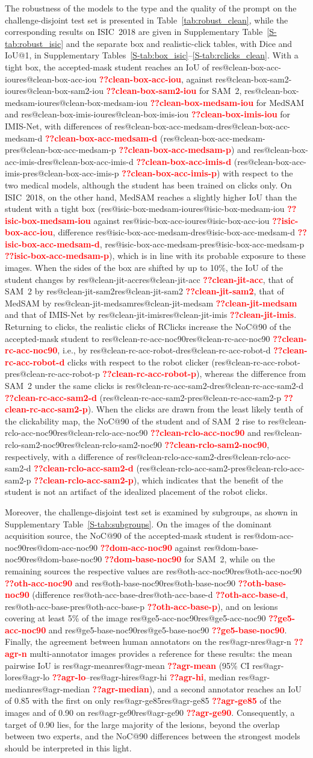 \documentclass[runningheads]{llncs}
\makeatletter
\newcommand{\res}[1]{\ifcsname res@#1\endcsname\csname res@#1\endcsname
  \else\textbf{\textcolor{red}{??#1}}\fi}
\newcommand{\gentable}[1]{\IfFileExists{generated/#1.tex}{}%
  {\begin{table}[t]\centering\fbox{\textcolor{red}{generated/#1.tex: run tools/paper\_outputs.sh}}\end{table}}}
\makeatother
\begin{document}
\gentable{robust_clean}

The robustness of the models to the type and the quality of the prompt on the challenge-disjoint test set is presented in Table~\ref{tab:robust_clean}, while the corresponding results on ISIC~2018 are given in Supplementary Table~\ref{S-tab:robust_isic} and the separate box and realistic-click tables, with Dice and IoU@1, in Supplementary Tables~\ref{S-tab:box_isic}--\ref{S-tab:rclicks_clean}. With a tight box, the accepted-mask student reaches an IoU of \res{clean-box-acc-iou}, against \res{clean-box-sam2-iou} for SAM~2, \res{clean-box-medsam-iou} for MedSAM and \res{clean-box-imis-iou} for IMIS-Net, with differences of \res{clean-box-acc-medsam-d} (\res{clean-box-acc-medsam-p}) and \res{clean-box-acc-imis-d} (\res{clean-box-acc-imis-p}) with respect to the two medical models, although the student has been trained on clicks only. On ISIC~2018, on the other hand, MedSAM reaches a slightly higher IoU than the student with a tight box (\res{isic-box-medsam-iou} against \res{isic-box-acc-iou}, difference \res{isic-box-acc-medsam-d}, \res{isic-box-acc-medsam-p}), which is in line with its probable exposure to these images. When the sides of the box are shifted by up to 10\%, the IoU of the student changes by \res{clean-jit-acc}, that of SAM~2 by \res{clean-jit-sam2}, that of MedSAM by \res{clean-jit-medsam} and that of IMIS-Net by \res{clean-jit-imis}. Returning to clicks, the realistic clicks of RClicks increase the NoC@90 of the accepted-mask student to \res{clean-rc-acc-noc90}, i.e., by \res{clean-rc-acc-robot-d} clicks with respect to the robot clicker (\res{clean-rc-acc-robot-p}), whereas the difference from SAM~2 under the same clicks is \res{clean-rc-acc-sam2-d} (\res{clean-rc-acc-sam2-p}). When the clicks are drawn from the least likely tenth of the clickability map, the NoC@90 of the student and of SAM~2 rise to \res{clean-rclo-acc-noc90} and \res{clean-rclo-sam2-noc90}, respectively, with a difference of \res{clean-rclo-acc-sam2-d} (\res{clean-rclo-acc-sam2-p}), which indicates that the benefit of the student is not an artifact of the idealized placement of the robot clicks.

Moreover, the challenge-disjoint test set is examined by subgroups, as shown in Supplementary Table~\ref{S-tab:subgroups}. On the images of the dominant acquisition source, the NoC@90 of the accepted-mask student is \res{dom-acc-noc90} against \res{dom-base-noc90} for SAM~2, while on the remaining sources the respective values are \res{oth-acc-noc90} and \res{oth-base-noc90} (difference \res{oth-acc-base-d}, \res{oth-acc-base-p}), and on lesions covering at least 5\% of the image \res{ge5-acc-noc90} and \res{ge5-base-noc90}. Finally, the agreement between human annotators on the \res{agr-n} multi-annotator images provides a reference for these results: the mean pairwise IoU is \res{agr-mean} (95\% CI \res{agr-lo}--\res{agr-hi}, median \res{agr-median}), and a second annotator reaches an IoU of 0.85 with the first on only \res{agr-ge85} of the images and of 0.90 on \res{agr-ge90}. Consequently, a target of 0.90 lies, for the large majority of the lesions, beyond the overlap between two experts, and the NoC@90 differences between the strongest models should be interpreted in this light.
\end{document}
